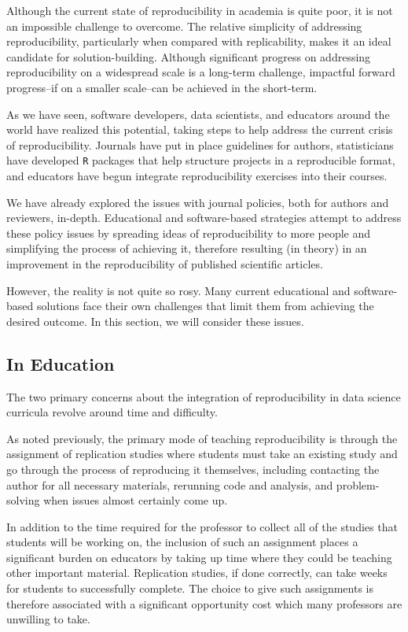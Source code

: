 \documentclass[12pt,twoside]{reedthesis}
\begin{document}
Although the current state of reproducibility in academia is quite poor,
it is not an impossible challenge to overcome. The relative simplicity
of addressing reproducibility, particularly when compared with
replicability, makes it an ideal candidate for solution-building.
Although significant progress on addressing reproducibility on a
widespread scale is a long-term challenge, impactful forward
progress--if on a smaller scale--can be achieved in the short-term.

As we have seen, software developers, data scientists, and educators
around the world have realized this potential, taking steps to help
address the current crisis of reproducibility. Journals have put in
place guidelines for authors, statisticians have developed \texttt{R}
packages that help structure projects in a reproducible format, and
educators have begun integrate reproducibility exercises into their
courses.

We have already explored the issues with journal policies, both for
authors and reviewers, in-depth. Educational and software-based
strategies attempt to address these policy issues by spreading ideas of
reproducibility to more people and simplifying the process of achieving
it, therefore resulting (in theory) in an improvement in the
reproducibility of published scientific articles.

However, the reality is not quite so rosy. Many current educational and
software-based solutions face their own challenges that limit them from
achieving the desired outcome. In this section, we will consider these
issues.

\subsection{In Education}\label{in-education}

The two primary concerns about the integration of reproducibility in
data science curricula revolve around time and difficulty.

As noted previously, the primary mode of teaching reproducibility is
through the assignment of replication studies where students must take
an existing study and go through the process of reproducing it
themselves, including contacting the author for all necessary materials,
rerunning code and analysis, and problem-solving when issues almost
certainly come up.

In addition to the time required for the professor to collect all of the
studies that students will be working on, the inclusion of such an
assignment places a significant burden on educators by taking up time
where they could be teaching other important material. Replication
studies, if done correctly, can take weeks for students to successfully
complete. The choice to give such assignments is therefore associated
with a significant opportunity cost which many professors are unwilling
to take.
\end{document}
